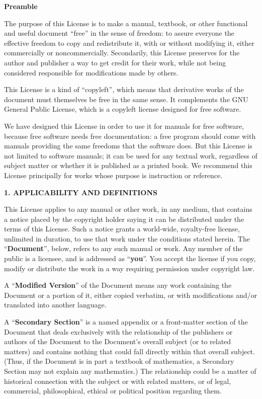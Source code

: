 \documentclass[onecolumn,a4paper]{article}
\numberwithin{equation}{section}
\begin{document}
\begin{center}
{\bf\large Preamble}
\end{center}

The purpose of this License is to make a manual, textbook, or other
functional and useful document ``free'' in the sense of freedom: to
assure everyone the effective freedom to copy and redistribute it,
with or without modifying it, either commercially or noncommercially.
Secondarily, this License preserves for the author and publisher a way
to get credit for their work, while not being considered responsible
for modifications made by others.

This License is a kind of ``copyleft'', which means that derivative
works of the document must themselves be free in the same sense.  It
complements the GNU General Public License, which is a copyleft
license designed for free software.

We have designed this License in order to use it for manuals for free
software, because free software needs free documentation: a free
program should come with manuals providing the same freedoms that the
software does.  But this License is not limited to software manuals;
it can be used for any textual work, regardless of subject matter or
whether it is published as a printed book.  We recommend this License
principally for works whose purpose is instruction or reference.

\begin{center}
{\Large\bf 1. APPLICABILITY AND DEFINITIONS\par}
\end{center}

This License applies to any manual or other work, in any medium, that
contains a notice placed by the copyright holder saying it can be
distributed under the terms of this License.  Such a notice grants a
world-wide, royalty-free license, unlimited in duration, to use that
work under the conditions stated herein.  The ``\textbf{Document}'', below,
refers to any such manual or work.  Any member of the public is a
licensee, and is addressed as ``\textbf{you}''.  You accept the license if you
copy, modify or distribute the work in a way requiring permission
under copyright law.

A ``\textbf{Modified Version}'' of the Document means any work containing the
Document or a portion of it, either copied verbatim, or with
modifications and/or translated into another language.

A ``\textbf{Secondary Section}'' is a named appendix or a front-matter section of
the Document that deals exclusively with the relationship of the
publishers or authors of the Document to the Document's overall subject
(or to related matters) and contains nothing that could fall directly
within that overall subject.  (Thus, if the Document is in part a
textbook of mathematics, a Secondary Section may not explain any
mathematics.)  The relationship could be a matter of historical
connection with the subject or with related matters, or of legal,
commercial, philosophical, ethical or political position regarding
them.
\end{document}
